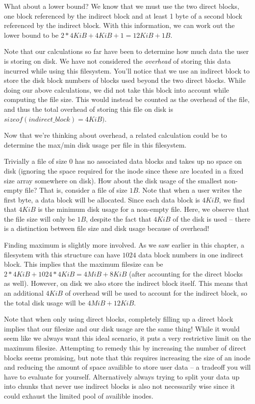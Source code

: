 What about a lower bound? We know that we must use the two direct blocks, one block referenced by the indirect block and at least 1 byte of a
second block referenced by the indirect block.
With this information, we can work out the lower bound to be $2*4KiB+4KiB+1=12KiB+1B$.

Note that our calculations so far have been to determine how much data the user is storing on disk.
We have not considered the \textit{overhead} of storing this data incurred while using this filesystem.
You'll notice that we use an indirect block to store the disk block numbers of blocks used beyond the two direct blocks.
While doing our above calculations, we did not take this block into account while computing the file size.
This would instead be counted as the overhead of the file, and thus the total overhead of storing this file on disk is $sizeof(indirect\_block)=4KiB)$.

Now that we're thinking about overhead, a related calculation could be to determine the max/min disk usage per file in this filesystem.

Trivially a file of size $0$ has no associated data blocks and takes up no space on disk (ignoring the space required for the inode since these are located in a fixed size array somewhere on disk).
How about the disk usage of the smallest non-empty file? That is, consider a file of size $1B$.
Note that when a user writes the first byte, a data block will be allocated.
Since each data block is $4KiB$, we find that $4KiB$ is the minimum disk usage for a non-empty file.
Here, we observe that the file size will only be $1B$, despite the fact that $4KiB$ of the disk is used -- there is a distinction between file size and disk usage because of overhead!

Finding maximum is slightly more involved.
As we saw earlier in this chapter, a filesystem with this structure can have $1024$ data block numbers in one indirect block.
This implies that the maximum filesize can be $2*4KiB + 1024*4KiB = 4MiB + 8KiB$ (after accounting for the direct blocks as well).
However, on disk we also store the indirect block itself.
This means that an additional $4KiB$ of overhead will be used to account for the indirect block, so the total disk usage will be $4MiB + 12KiB$.

Note that when only using direct blocks, completely filling up a direct block implies that our filesize and our disk usage are the same thing!
While it would seem like we always want this ideal scenario, it puts a very restrictive limit on the maximum filesize.
Attempting to remedy this by increasing the number of direct blocks seems promising, but note that this requires increasing the size of an inode and reducing the amount of space availible to store user data -- a tradeoff you will have to evaluate for yourself.
Alternatively always trying to split your data up into chunks that never use indirect blocks is also not necessarily wise since it could exhaust the limited pool of availible inodes.



